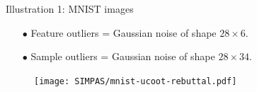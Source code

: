 \documentclass{beamer}
\begin{document}
\begin{frame}{Illustration 1: MNIST images}
\scriptsize
\begin{itemize}
  \item[$\bullet$] Feature outliers = Gaussian noise of shape $28 \times 6$.
  \item[$\bullet$] Sample outliers = Gaussian noise of shape $28 \times 34$.
\end{itemize}
\vspace{-0.5cm}
\begin{figure}
    \centering
    \texttt{[image: SIMPAS/mnist-ucoot-rebuttal.pdf]}
    \vspace*{-1cm}
\end{figure}


\end{frame}
\end{document}
